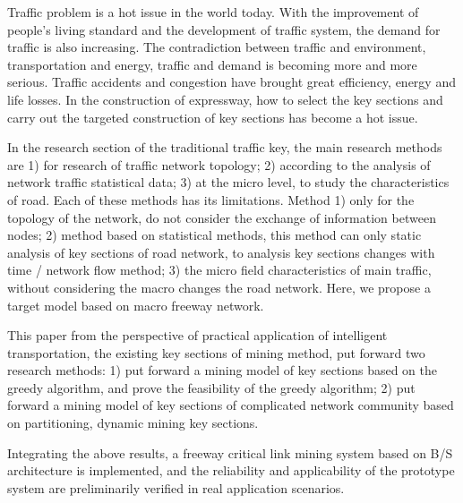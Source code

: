 \begin{eabstract}
	Traffic problem is a hot issue in the world today. With the improvement of people's living standard and the development of traffic system, the demand for traffic is also increasing. The contradiction between traffic and environment, transportation and energy, traffic and demand is becoming more and more serious. Traffic accidents and congestion have brought great efficiency, energy and life losses. In the construction of expressway, how to select the key sections and carry out the targeted construction of key sections has become a hot issue.
	
	In the research section of the traditional traffic key, the main research methods are 1) for research of traffic network topology; 2) according to the analysis of network traffic statistical data; 3) at the micro level, to study the characteristics of road. Each of these methods has its limitations. Method 1) only for the topology of the network, do not consider the exchange of information between nodes; 2) method based on statistical methods, this method can only static analysis of key sections of road network, to analysis key sections changes with time / network flow method; 3) the micro field characteristics of main traffic, without considering the macro changes the road network. Here, we propose a target model based on macro freeway network.

	This paper from the perspective of practical application of intelligent transportation, the existing key sections of mining method, put forward two research methods: 1) put forward a mining model of key sections based on the greedy algorithm, and prove the feasibility of the greedy algorithm; 2) put forward a mining model of key sections of complicated network community based on partitioning, dynamic mining key sections.
	
	Integrating the above results, a freeway critical link mining system based on B/S architecture is implemented, and the reliability and applicability of the prototype system are preliminarily verified in real application scenarios.

\end{eabstract}

